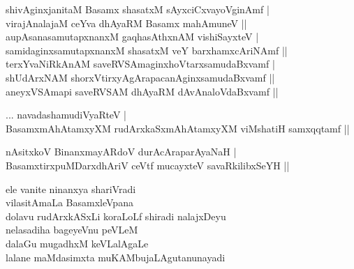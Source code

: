 \begin{entry}
\begin{shl}
shivAginxjanitaM Basamx shasatxM sAyxciCxvayoVginAmf |\\
virajAnalajaM ceYva dhAyaRM Basamx mahAmuneV ||\\
aupAsanasamutapxnanxM gaqhasAthxnAM vishiSayxteV |\\
samidaginxsamutapxnanxM shasatxM veY barxhamxcAriNAmf ||\\
terxYvaNiRkAnAM saveRVSAmaginxhoVtarxsamudaBxvamf |\\
shUdArxNAM shorxVtirxyAgArapacanAginxsamudaBxvamf ||\\
aneyxVSAmapi saveRVSAM dhAyaRM dAvAnaloVdaBxvamf ||
\end{shl}
\end{entry}

\begin{entry}
\begin{shl}
... navadashamudiVyaRteV |\\
BasamxmAhAtamxyXM rudArxkaSxmAhAtamxyXM viMshatiH samxqqtamf ||
\end{shl}
\begin{shl}
nAsitxkoV BinanxmayARdoV durAcAraparAyaNaH |\\
BasamxtirxpuMDarxdhAriV ceVtf mucayxteV savaRkilibxSeYH ||
\end{shl}
\end{entry}

\begin{entry}
\gl{}
\begin{shl}
ele vanite ninanxya shariVradi\\
vilasitAmaLa BasamxleVpana\\
dolavu rudArxkASxLi koraLoLf shiradi nalajxDeyu\\
nelasadiha bageyeVnu peVLeM\\
dalaGu mugadhxM keVLalAgaLe\\
lalane maMdasimxta muKAMbujaLAgutanunayadi
\end{shl}
\end{entry}

